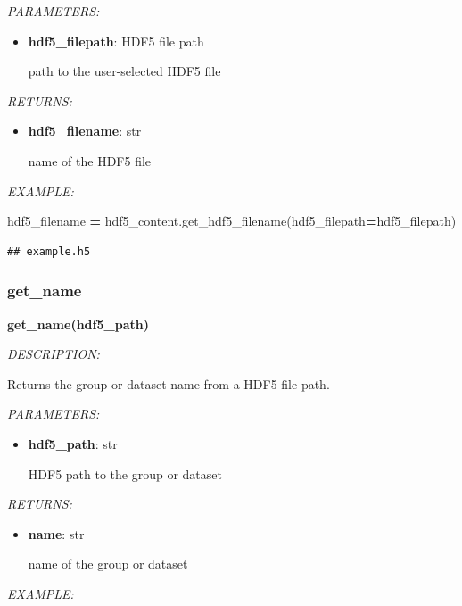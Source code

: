 \documentclass[
]{article}
\newenvironment{Shaded}{\begin{snugshade}}{\end{snugshade}}
\newcommand{\NormalTok}[1]{#1}
\newcommand{\OperatorTok}[1]{\textcolor[rgb]{0.81,0.36,0.00}{\textbf{#1}}}
\begin{document}
\emph{PARAMETERS:}

\begin{itemize}
\item
  \textbf{hdf5\_filepath}: HDF5 file path

  path to the user-selected HDF5 file
\end{itemize}

\emph{RETURNS:}

\begin{itemize}
\item
  \textbf{hdf5\_filename}: str

  name of the HDF5 file
\end{itemize}

\emph{EXAMPLE:}

\begin{Shaded}
\begin{Highlighting}[]
\NormalTok{hdf5_filename }\OperatorTok{=}\NormalTok{ hdf5_content.get_hdf5_filename(hdf5_filepath}\OperatorTok{=}\NormalTok{hdf5_filepath)}
\end{Highlighting}
\end{Shaded}

\begin{verbatim}
## example.h5
\end{verbatim}

\hypertarget{get_name}{%
\subsubsection{get\_name}\label{get_name}}

\textbf{get\_name(hdf5\_path)}

\emph{DESCRIPTION:}

Returns the group or dataset name from a HDF5 file path.

\emph{PARAMETERS:}

\begin{itemize}
\item
  \textbf{hdf5\_path}: str

  HDF5 path to the group or dataset
\end{itemize}

\emph{RETURNS:}

\begin{itemize}
\item
  \textbf{name}: str

  name of the group or dataset
\end{itemize}

\emph{EXAMPLE:}
\end{document}
